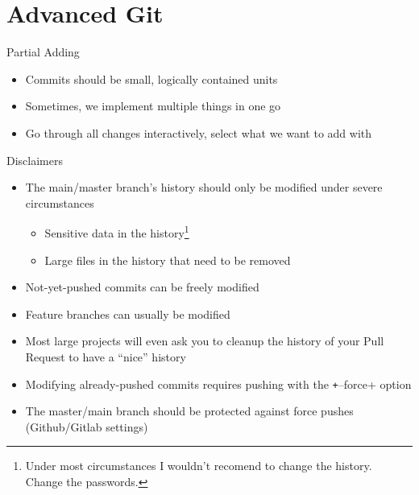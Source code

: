 \section{Advanced Git}

\begin{frame}[c, fragile]{Partial Adding}
  \begin{itemize}
    \item Commits should be small, logically contained units
    \item Sometimes, we implement multiple things in one go 
    \item Go through all changes interactively, select what we want to add with
  \end{itemize}
\end{frame}

%

\begin{frame}[c]{Disclaimers}
  \begin{itemize}
    \item The main/master branch's history should only be modified under severe circumstances\\
      \begin{itemize}
        \item Sensitive data in the history\footnote{Under most circumstances I wouldn't recomend to change the history. Change the passwords.}
        \item Large files in the history that need to be removed
      \end{itemize}
    \item Not-yet-pushed commits can be freely modified
    \item Feature branches can usually be modified
    \item Most large projects will even ask you to cleanup the history of your Pull Request to have a \enquote{nice} history
    \item Modifying already-pushed commits requires pushing with the \texttt+--force+ option
    \item The master/main branch should be protected against force pushes\\
      (Github/Gitlab settings)
  \end{itemize}
\end{frame}

